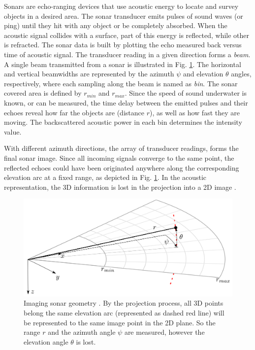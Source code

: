 \documentclass[final,5p,times]{elsarticle}
\begin{document}
Sonars are echo-ranging devices that use acoustic energy to locate and survey objects in a desired area. The sonar transducer emits pulses of sound waves (or ping) until they hit with any object or be completely absorbed. When the acoustic signal collides with a surface, part of this energy is reflected, while other is refracted. The sonar data is built by plotting the echo measured back versus time of acoustic signal. The transducer reading in a given direction forms a \textit{beam}. A single beam transmitted from a sonar is illustrated in Fig. \ref{fig:sonar_geometry}. The horizontal and vertical beamwidths are represented by the azimuth $\psi$ and elevation $\theta$ angles, respectively, where each sampling along the beam is named as \textit{bin}. The sonar covered area is defined by $r_{min}$ and $r_{max}$. Since the speed of sound underwater is known, or can be measured, the time delay between the emitted pulses and their echoes reveal how far the objects are (distance $r$), as well as how fast they are moving. The backscattered acoustic power in each bin determines the intensity value.

With different azimuth directions, the array of transducer readings, forms the final sonar image. Since all incoming signals converge to the same point, the reflected echoes could have been originated anywhere along the corresponding elevation arc at a fixed range, as depicted in Fig. \ref{fig:sonar_geometry}. In the acoustic representation, the 3D information is lost in the projection into a 2D image \cite{huang2015}.

\begin{figure}[t]
    \includegraphics[width=\columnwidth]{figs/sonar_geometry}
    \centering
    \captionsetup{justification=centering}
    \caption{Imaging sonar geometry \cite{huang2015}. By the projection process, all 3D points belong the same elevation arc (represented as dashed red line) will be represented to the same image point in the 2D plane. So the range $r$ and the azimuth angle $\psi$ are measured, however the elevation angle $\theta$ is lost.}
    \label{fig:sonar_geometry}
\end{figure}
\end{document}
